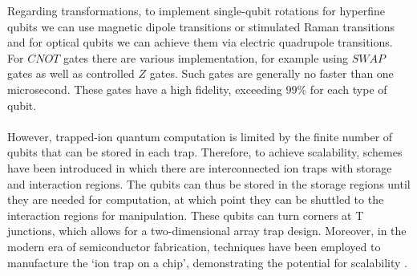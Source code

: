 Regarding transformations, to implement single-qubit rotations for hyperfine qubits we can use magnetic dipole transitions or stimulated Raman transitions and for optical qubits we can achieve them via electric quadrupole transitions. For $CNOT$ gates there are various implementation, for example using $SWAP$ gates as well as controlled $Z$ gates. Such gates are generally no faster than one microsecond. These gates have a high fidelity, exceeding $99\%$ for each type of qubit. \\
\\
However, trapped-ion quantum computation is limited by the finite number of qubits that can be stored in each trap. Therefore, to achieve scalability, schemes have been introduced in which there are interconnected ion traps with storage and interaction regions. The qubits can thus be stored in the storage regions until they are needed for computation, at which point they can be shuttled to the interaction regions for manipulation. These qubits can turn corners at T junctions, which allows for a two-dimensional array trap design. Moreover, in the modern era of semiconductor fabrication, techniques have been employed to manufacture the ‘ion trap on a chip’, demonstrating the potential for scalability \cite{Bruzewicz2019Apr}.

